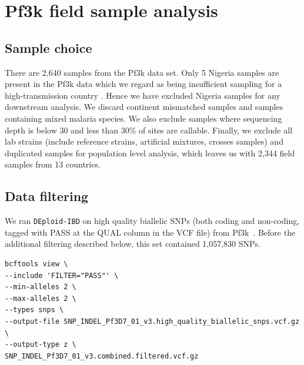 \documentclass[9pt]{article}
\begin{document}


\newpage

\section{Pf3k field sample analysis}
\subsection{Sample choice}
There are 2,640 samples from the Pf3k data set. Only 5 Nigeria samples are present in the Pf3k data which we regard as being insufficient sampling for a high-transmission country \citep{who2017profileNigeria}. Hence we have excluded Nigeria samples for any downstream analysis. We discard continent mismatched samples and samples containing mixed malaria species. We also exclude samples where sequencing depth is below 30 and less than 30\% of sites are callable. Finally, we exclude all lab strains (include reference strains, artificial mixtures, crosses samples) and duplicated samples for population level analysis, which leaves us with 2,344 field samples from 13 countries.


\subsection{Data filtering}
We ran {\tt DEploid-IBD} on high quality biallelic SNPs (both coding and non-coding, tagged with PASS at the QUAL column in the VCF file) from Pf3k~\citep{pf3k}. Before the additional filtering described below, this set contained 1,057,830 SNPs.
\linespread{1}
\begin{lstlisting}
bcftools view \
--include 'FILTER="PASS"' \
--min-alleles 2 \
--max-alleles 2 \
--types snps \
--output-file SNP_INDEL_Pf3D7_01_v3.high_quality_biallelic_snps.vcf.gz \
--output-type z \
SNP_INDEL_Pf3D7_01_v3.combined.filtered.vcf.gz
\end{lstlisting}
\end{document}
